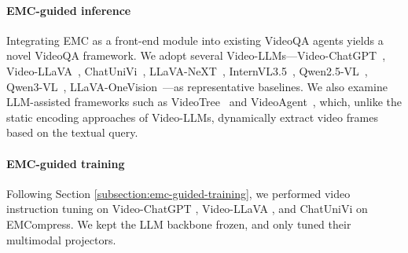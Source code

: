 

\paragraph{EMC-guided inference}
Integrating EMC as a front-end module into existing VideoQA agents yields a novel VideoQA framework. We adopt several Video-LLMs---Video-ChatGPT~\citep{maaz-etal-2024-video}, Video-LLaVA~\citep{lin2023video}, ChatUniVi~\citep{chatunivi}, LLaVA-NeXT~\citep{liu2024llavanext}, InternVL3.5~\citep{InternVL3}, Qwen2.5-VL~\citep{qwen2.5vl}, Qwen3-VL~\citep{qwen3vl}, LLaVA-OneVision~\citep{llavaonevision}---as representative baselines. We also examine LLM-assisted frameworks such as VideoTree~\citep{wang2024videotreeadaptivetreebasedvideo} and VideoAgent~\citep{VideoAgent}, which, unlike the static encoding approaches of Video-LLMs, dynamically extract video frames based on the textual query.


\paragraph{EMC-guided training}
Following Section \ref{subsection:emc-guided-training}, we performed video instruction tuning on Video-ChatGPT \citep{maaz-etal-2024-video}, Video-LLaVA \citep{lin2023video}, and ChatUniVi \citep{chatunivi} on EMCompress. We kept the LLM backbone frozen, and only tuned their multimodal projectors.